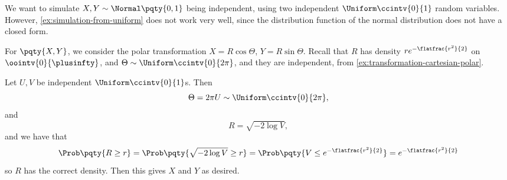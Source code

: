 \begin{example}
    \label{ex:box-muller}%
    We want to simulate \(X, Y \sim \Normal\pqty{0, 1}\) being independent, using two independent \(\Uniform\ccintv{0}{1}\) random variables. However, \autoref{ex:simulation-from-uniform} does not work very well, since the distribution function of the normal distribution does not have a closed form.

    For \(\pqty{X, Y}\), we consider the polar transformation \(X = R \cos \Theta\), \(Y = R \sin \Theta\). Recall that \(R\) has density \(r e^{- \flatfrac{r^2}{2}}\) on \(\oointv{0}{\plusinfty}\), and \(\Theta \sim \Uniform \ccintv{0}{2\pi}\), and they are independent, from \autoref{ex:transformation-cartesian-polar}.

    Let \(U, V\) be independent \(\Uniform\ccintv{0}{1}\)s. Then
    \[
        \Theta = 2 \pi U \sim \Uniform \ccintv{0}{2\pi},
    \]
    and
    \[
        R = \sqrt{- 2 \log V},
    \]
    and we have that
    \[
        \Prob\pqty{R \geq r} = \Prob\pqty{\sqrt{- 2 \log V} \geq r} = \Prob\pqty{V \leq e^{- \flatfrac{r^2}{2}}} = e^{- \flatfrac{r^2}{2}}
    \]
    so \(R\) has the correct density. Then this gives \(X\) and \(Y\) as desired.
\end{example}

